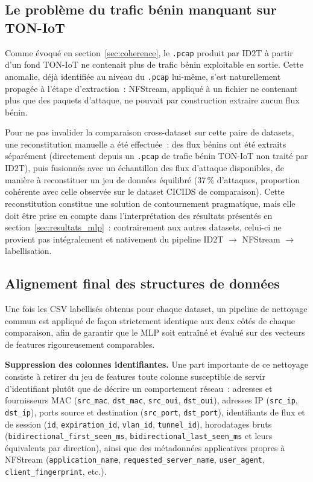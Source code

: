 \documentclass[12pt, a4paper]{report}
\begin{document}
\subsection{Le problème du trafic bénin manquant sur TON-IoT}
 
Comme évoqué en section~\ref{sec:coherence}, le \texttt{.pcap} produit
par ID2T à partir d'un fond TON-IoT ne contenait plus de trafic bénin
exploitable en sortie. Cette anomalie, déjà identifiée au niveau du
\texttt{.pcap} lui-même, s'est naturellement propagée à l'étape
d'extraction~: NFStream, appliqué à un fichier ne contenant plus que
des paquets d'attaque, ne pouvait par construction extraire aucun flux
bénin.
 
Pour ne pas invalider la comparaison cross-dataset sur cette paire de
datasets, une reconstitution manuelle a été effectuée~: des flux bénins
ont été extraits séparément (directement depuis un \texttt{.pcap} de
trafic bénin TON-IoT non traité par ID2T), puis fusionnés avec un
échantillon des flux d'attaque disponibles, de manière à reconstituer
un jeu de données équilibré (37\,\% d'attaques, proportion cohérente
avec celle observée sur le dataset CICIDS de comparaison). Cette
reconstitution constitue une solution de contournement pragmatique,
mais elle doit être prise en compte dans l'interprétation des résultats
présentés en section~\ref{sec:resultats_mlp}~: contrairement aux autres
datasets, celui-ci ne provient pas intégralement et nativement du
pipeline ID2T $\rightarrow$ NFStream $\rightarrow$ labellisation.
 
\subsection{Alignement final des structures de données}
\label{sec:pipeline_align}

Une fois les CSV labellisés obtenus pour chaque dataset, un pipeline de
nettoyage commun est appliqué de façon strictement identique aux deux
côtés de chaque comparaison, afin de garantir que le MLP soit entraîné
et évalué sur des vecteurs de features rigoureusement comparables.

\textbf{Suppression des colonnes identifiantes.} Une part importante de
ce nettoyage consiste à retirer du jeu de features toute colonne
susceptible de servir d'identifiant plutôt que de décrire un
comportement réseau~: adresses et fournisseurs MAC (\texttt{src\_mac},
\texttt{dst\_mac}, \texttt{src\_oui}, \texttt{dst\_oui}), adresses IP
(\texttt{src\_ip}, \texttt{dst\_ip}), ports source et destination
(\texttt{src\_port}, \texttt{dst\_port}), identifiants de flux et de
session (\texttt{id}, \texttt{expiration\_id}, \texttt{vlan\_id},
\texttt{tunnel\_id}), horodatages bruts
(\texttt{bidirectional\_first\_seen\_ms},
\texttt{bidirectional\_last\_seen\_ms} et leurs équivalents par
direction), ainsi que des métadonnées applicatives propres à NFStream
(\texttt{application\_name}, \texttt{requested\_server\_name},
\texttt{user\_agent}, \texttt{client\_fingerprint}, etc.).
\end{document}
